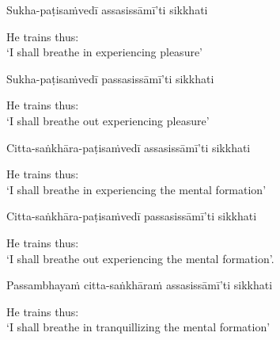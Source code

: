 Sukha-paṭisaṁvedī assasissāmī'ti sikkhati

\begin{english}
  He trains thus:\\
  `I shall breathe in experiencing pleasure'
\end{english}

\ifninebythirteen\clearpage\fi

Sukha-paṭisaṁvedī passasissāmī'ti sikkhati

\begin{english}
  He trains thus:\\
  `I shall breathe out experiencing pleasure'
\end{english}

Citta-saṅkhāra-paṭisaṁvedī assasissāmī'ti sikkhati

\begin{english}
  He trains thus:\\
  `I shall breathe in experiencing the mental formation'\ifdigital\makeatletter\hyperlink{endnote69-appendix}\makeatother\fi
\end{english}

Citta-saṅkhāra-paṭisaṁvedī passasissāmī'ti sikkhati

\begin{english}
  He trains thus:\\
  `I shall breathe out experiencing the mental formation'.
\end{english}

\begin{pali-hang}
Passambhayaṁ citta-saṅkhāraṁ assasissāmī'ti sikkhati
\end{pali-hang}

\begin{english}
  He trains thus:\\
  `I shall breathe in tranquillizing the mental formation'\ifdigital\makeatletter\hyperlink{endnote70-appendix}\makeatother\fi
\end{english}


